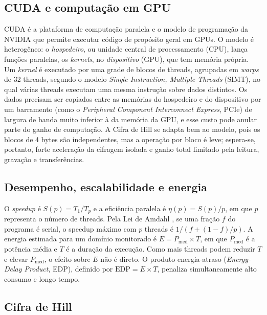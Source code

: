 \documentclass[12pt]{article}
\begin{document}
\subsection{CUDA e computação em GPU}

CUDA é a plataforma de computação paralela e o modelo de programação da
NVIDIA \cite{nvidia_cuda_guide} que permite executar código de propósito geral
em GPUs. O modelo é heterogêneo: o \textit{hospedeiro}, ou unidade central de
processamento (CPU), lança funções paralelas, os \textit{kernels}, no
\textit{dispositivo} (GPU), que tem memória própria. Um \textit{kernel} é
executado por uma grade de blocos de threads, agrupadas em \textit{warps} de 32
threads, segundo o modelo \textit{Single Instruction, Multiple Threads}
(SIMT), no qual várias threads executam uma mesma instrução sobre dados
distintos. Os dados precisam ser copiados entre as memórias do hospedeiro e do
dispositivo por um barramento (como o \textit{Peripheral Component Interconnect
Express}, PCIe) de largura de banda muito inferior à da memória da GPU,
e esse custo pode anular parte do ganho de computação. A Cifra de Hill se
adapta bem ao modelo, pois os blocos de 4 bytes são independentes, mas a
operação por bloco é leve; espera-se, portanto, forte aceleração da cifragem
isolada e ganho total limitado pela leitura, gravação e transferências.

\subsection{Desempenho, escalabilidade e energia}

O \textit{speedup} é $S(p) = T_1/T_p$ e a eficiência paralela é
$\eta(p) = S(p)/p$, em que $p$ representa o número de threads. Pela Lei de
Amdahl \cite{amdahl1967}, se uma fração $f$ do programa é serial, o speedup
máximo com $p$ threads é $1/(f + (1-f)/p)$. A energia estimada para um domínio
monitorado é $E = P_{\mathrm{med}}\times T$, em que $P_{\mathrm{med}}$ é a
potência média e $T$ é a duração da execução. Como mais threads podem reduzir
$T$ e elevar $P_{\mathrm{med}}$, o efeito sobre $E$ não é direto. O produto
energia-atraso (\textit{Energy-Delay Product}, EDP), definido por
$\mathrm{EDP} = E\times T$, penaliza simultaneamente alto consumo e longo tempo.

\subsection{Cifra de Hill}
\end{document}
